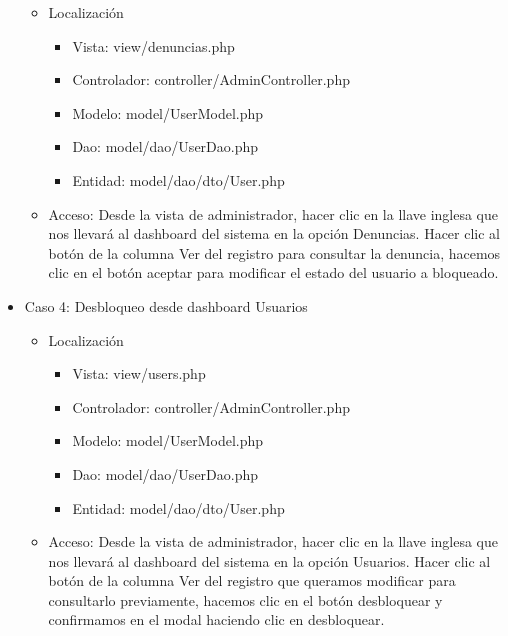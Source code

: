 \begin{itemize}
\begin{itemize}
\item Localizaci\'{o}n
\begin{itemize}
\item Vista: view/denuncias.php
\item Controlador: controller/AdminController.php
\item Modelo: model/UserModel.php
\item Dao: model/dao/UserDao.php
\item Entidad: model/dao/dto/User.php
\end{itemize}
\item Acceso: Desde la vista de administrador, hacer clic en la llave inglesa que nos llevar\'{a} al dashboard del sistema en la opci\'{o}n Denuncias. Hacer clic al bot\'{o}n de la columna Ver del registro para consultar la denuncia, hacemos clic en el bot\'{o}n aceptar para modificar el estado del usuario a bloqueado.
\end{itemize}
\item Caso 4: Desbloqueo desde dashboard Usuarios
\begin{itemize}
\item Localizaci\'{o}n
\begin{itemize}
\item Vista: view/users.php
\item Controlador: controller/AdminController.php
\item Modelo: model/UserModel.php
\item Dao: model/dao/UserDao.php
\item Entidad: model/dao/dto/User.php
\end{itemize}
\item Acceso: Desde la vista de administrador, hacer clic en la llave inglesa que nos llevar\'{a} al dashboard del sistema en la opci\'{o}n Usuarios. Hacer clic al bot\'{o}n de la columna Ver del registro que queramos modificar para consultarlo previamente, hacemos clic en el bot\'{o}n desbloquear y confirmamos en el modal haciendo clic en desbloquear.
\end{itemize}
\end{itemize}

